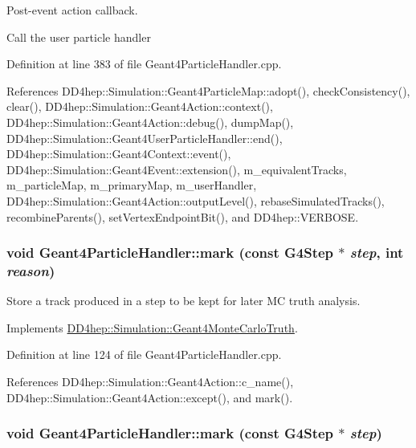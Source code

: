 Post-\/event action callback. 

Call the user particle handler 

Definition at line 383 of file Geant4ParticleHandler.cpp.

References DD4hep::Simulation::Geant4ParticleMap::adopt(), checkConsistency(), clear(), DD4hep::Simulation::Geant4Action::context(), DD4hep::Simulation::Geant4Action::debug(), dumpMap(), DD4hep::Simulation::Geant4UserParticleHandler::end(), DD4hep::Simulation::Geant4Context::event(), DD4hep::Simulation::Geant4Event::extension(), m\_\-equivalentTracks, m\_\-particleMap, m\_\-primaryMap, m\_\-userHandler, DD4hep::Simulation::Geant4Action::outputLevel(), rebaseSimulatedTracks(), recombineParents(), setVertexEndpointBit(), and DD4hep::VERBOSE.\hypertarget{class_d_d4hep_1_1_simulation_1_1_geant4_particle_handler_a7a351cfb66cc4e50b9f184b2e80855f4}{
\subsubsection[{mark}]{\setlength{\rightskip}{0pt plus 5cm}void Geant4ParticleHandler::mark (const G4Step $\ast$ {\em step}, \/  int {\em reason})}}
\label{class_d_d4hep_1_1_simulation_1_1_geant4_particle_handler_a7a351cfb66cc4e50b9f184b2e80855f4}


Store a track produced in a step to be kept for later MC truth analysis. 

Implements \hyperlink{class_d_d4hep_1_1_simulation_1_1_geant4_monte_carlo_truth_aaa3fb07338363616c0a898d791d24314}{DD4hep::Simulation::Geant4MonteCarloTruth}.

Definition at line 124 of file Geant4ParticleHandler.cpp.

References DD4hep::Simulation::Geant4Action::c\_\-name(), DD4hep::Simulation::Geant4Action::except(), and mark().\hypertarget{class_d_d4hep_1_1_simulation_1_1_geant4_particle_handler_aa03024ccc930c57fcfcd515605072f4b}{
\subsubsection[{mark}]{\setlength{\rightskip}{0pt plus 5cm}void Geant4ParticleHandler::mark (const G4Step $\ast$ {\em step})}}
\label{class_d_d4hep_1_1_simulation_1_1_geant4_particle_handler_aa03024ccc930c57fcfcd515605072f4b}


